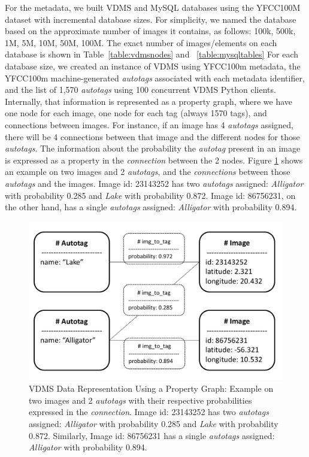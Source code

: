 For the metadata, we built VDMS and MySQL databases
using the YFCC100M dataset with incremental database sizes.
For simplicity, we named the database based on the approximate number of images
it contains, as follows: 100k, 500k, 1M, 5M, 10M, 50M, 100M.
The exact number of images/elements on each database is shown in
Table~\ref{table:vdmsnodes} and ~\ref{table:mysqltables}
For each database size, we created an instance of VDMS using YFCC100m metadata,
the YFCC100m machine-generated \textit{autotags} associated with
each metadata identifier, and the list of 1,570 \textit{autotags}
using 100 concurrent VDMS Python clients.
Internally, that information is represented as a property graph,
where we have one node for each image, one node for each tag
(always 1570 tags), and connections between images.
For instance, if an image has 4 \textit{autotags} assigned,
there will be 4 connections between that image and
the different nodes for those \textit{autotags}.
The information about the probability the \textit{autotag} present in an image
is expressed as a property in the \textit{connection} between the 2 nodes.
Figure \ref{fig:graph_representation} shows an example on two images and
2 \textit{autotags}, and the \textit{connections} between those \textit{autotags}
and the images.
Image id: 23143252 has two \textit{autotags} assigned:
\textit{Alligator} with probability 0.285 and \textit{Lake} with probability 0.872.
Image id: 86756231, on the other hand, has a single \textit{autotags} assigned:
\textit{Alligator} with probability 0.894.

\begin{figure}[]
\centering
\includegraphics[width=\columnwidth]{figures/graph_representation}
\caption{VDMS Data Representation Using a Property Graph:
Example on two images and 2 \textit{autotags} with
their respective probabilities expressed in the \textit{connection}.
Image id: 23143252 has two \textit{autotags} assigned:
\textit{Alligator} with probability 0.285 and \textit{Lake} with probability 0.872.
Similarly, Image id: 86756231 has a single \textit{autotags} assigned:
\textit{Alligator} with probability 0.894.}
\label{fig:graph_representation}
\end{figure}

